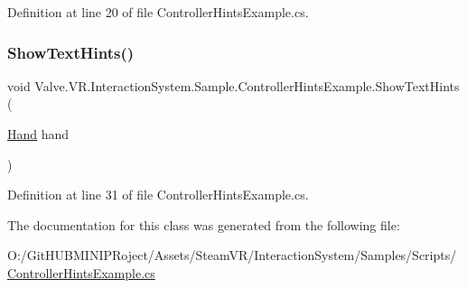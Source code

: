 Definition at line 20 of file Controller\+Hints\+Example.\+cs.

\mbox{\label{class_valve_1_1_v_r_1_1_interaction_system_1_1_sample_1_1_controller_hints_example_a2b02bec630167345bb790f2c0c68d477}} 
\subsubsection{\texorpdfstring{ShowTextHints()}{ShowTextHints()}}
{\footnotesize\ttfamily void Valve.\+V\+R.\+Interaction\+System.\+Sample.\+Controller\+Hints\+Example.\+Show\+Text\+Hints (\begin{DoxyParamCaption}\item[{\mbox{\hyperlink{class_valve_1_1_v_r_1_1_interaction_system_1_1_hand}{Hand}}}]{hand }\end{DoxyParamCaption})}



Definition at line 31 of file Controller\+Hints\+Example.\+cs.



The documentation for this class was generated from the following file\+:\begin{DoxyCompactItemize}
\item 
O\+:/\+Git\+H\+U\+B\+M\+I\+N\+I\+P\+Roject/\+Assets/\+Steam\+V\+R/\+Interaction\+System/\+Samples/\+Scripts/\mbox{\hyperlink{_controller_hints_example_8cs}{Controller\+Hints\+Example.\+cs}}\end{DoxyCompactItemize}
